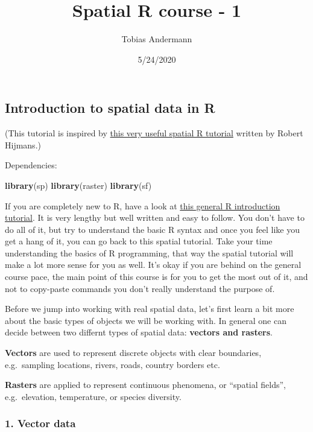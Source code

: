 \documentclass[]{article}
\title{Spatial R course - 1}
\author{Tobias Andermann}
\date{5/24/2020}
\newenvironment{Shaded}{\begin{snugshade}}{\end{snugshade}}
\newcommand{\KeywordTok}[1]{\textcolor[rgb]{0.13,0.29,0.53}{\textbf{#1}}}
\newcommand{\NormalTok}[1]{#1}
\begin{document}
\maketitle

\hypertarget{introduction-to-spatial-data-in-r}{%
\subsection{Introduction to spatial data in
R}\label{introduction-to-spatial-data-in-r}}

(This tutorial is inspired by
\href{http://rspatial.org/spatial/index.html}{this very useful spatial R
tutorial} written by Robert Hijmans.)

Dependencies:

\begin{Shaded}
\begin{Highlighting}[]
\KeywordTok{library}\NormalTok{(sp)}
\KeywordTok{library}\NormalTok{(raster)}
\KeywordTok{library}\NormalTok{(sf)}
\end{Highlighting}
\end{Shaded}

If you are completely new to R, have a look at
\href{https://rspatial.org/intr/index.html}{this general R introduction
tutorial}. It is very lengthy but well written and easy to follow. You
don't have to do all of it, but try to understand the basic R syntax and
once you feel like you get a hang of it, you can go back to this spatial
tutorial. Take your time understanding the basics of R programming, that
way the spatial tutorial will make a lot more sense for you as well.
It's okay if you are behind on the general course pace, the main point
of this course is for you to get the most out of it, and not to
copy-paste commands you don't really understand the purpose of.

Before we jump into working with real spatial data, let's first learn a
bit more about the basic types of objects we will be working with. In
general one can decide between two differnt types of spatial data:
\textbf{vectors and rasters}.

\textbf{Vectors} are used to represent discrete objects with clear
boundaries, e.g.~sampling locations, rivers, roads, country borders etc.

\textbf{Rasters} are applied to represent continuous phenomena, or
``spatial fields'', e.g.~elevation, temperature, or species diversity.

\hypertarget{vector-data}{%
\subsubsection{1. Vector data}\label{vector-data}}
\end{document}
